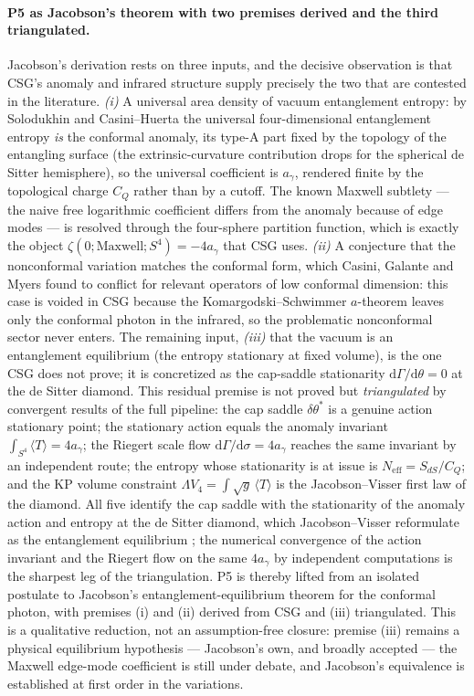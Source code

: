 \documentclass[11pt,a4paper]{article}
\theoremstyle{plain}
\theoremstyle{definition}
\theoremstyle{remark}
\newcommand{\ag}{a_\gamma}
\newcommand{\CQ}{C_Q}
\begin{document}
\paragraph{P5 as Jacobson's theorem with two premises derived and the third triangulated.}
Jacobson's derivation rests on three inputs, and the decisive observation is that CSG's anomaly
and infrared structure supply precisely the two that are contested in the literature. \emph{(i)} A
universal area density of vacuum entanglement entropy: by Solodukhin and Casini--Huerta the
universal four-dimensional entanglement entropy \emph{is} the conformal anomaly, its type-A part
fixed by the topology of the entangling surface (the extrinsic-curvature contribution drops for the
spherical de Sitter hemisphere), so the universal coefficient is $\ag$, rendered finite by the
topological charge $\CQ$ rather than by a cutoff. The known Maxwell subtlety --- the naive free
logarithmic coefficient differs from the anomaly because of edge modes --- is resolved through the
four-sphere partition function, which is exactly the object $\zeta(0;\text{Maxwell};S^4)=-4\ag$ that
CSG uses. \emph{(ii)} A conjecture that the nonconformal variation matches the conformal form, which
Casini, Galante and Myers found to conflict for relevant operators of low conformal dimension: this
case is voided in CSG because the Komargodski--Schwimmer $a$-theorem leaves only the conformal photon
in the infrared, so the problematic nonconformal sector never enters. The remaining input,
\emph{(iii)} that the vacuum is an entanglement equilibrium (the entropy stationary at fixed volume),
is the one CSG does not prove; it is concretized as the cap-saddle stationarity
$\mathrm{d}\Gamma/\mathrm{d}\theta=0$ at the de Sitter diamond. This residual premise is not proved
but \emph{triangulated} by convergent results of the full pipeline: the cap saddle $\delta\theta^*$ is
a genuine action stationary point; the stationary action equals the anomaly invariant
$\int_{S^4}\langle T\rangle=4\ag$; the Riegert scale flow $\mathrm{d}\Gamma/\mathrm{d}\sigma=4\ag$
reaches the same invariant by an independent route; the entropy whose stationarity is at issue is
$N_{\mathrm{eff}}=S_{dS}/\CQ$; and the KP volume constraint $\Lambda V_4=\int\!\sqrt{g}\,\langle
T\rangle$ is the Jacobson--Visser first law of the diamond. All five identify the cap saddle with the
stationarity of the anomaly action and entropy at the de Sitter diamond, which Jacobson--Visser
reformulate as the entanglement equilibrium \cite{JacobsonVisser2019}; the numerical convergence of
the action invariant and the Riegert flow on the same $4\ag$ by independent computations is the
sharpest leg of the triangulation. P5 is thereby lifted from an isolated postulate to Jacobson's
entanglement-equilibrium theorem for the conformal photon, with premises (i) and (ii) derived from
CSG and (iii) triangulated. This is a qualitative reduction, not an assumption-free closure: premise
(iii) remains a physical equilibrium hypothesis --- Jacobson's own, and broadly accepted --- the
Maxwell edge-mode coefficient is still under debate, and Jacobson's equivalence is established at
first order in the variations.
\end{document}
